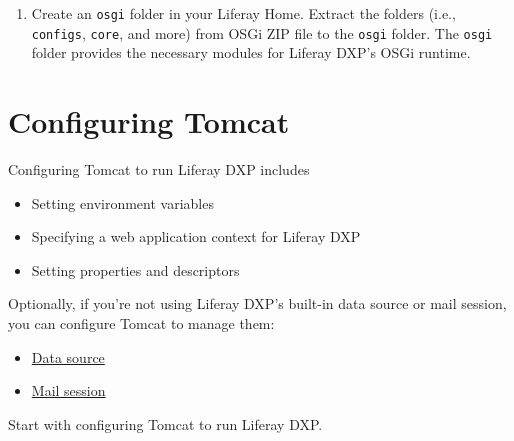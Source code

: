 \noindent\hrulefill

\begin{enumerate}
\def\labelenumi{\arabic{enumi}.}
\setcounter{enumi}{3}
\tightlist
\item
  Create an \texttt{osgi} folder in your Liferay Home. Extract the
  folders (i.e., \texttt{configs}, \texttt{core}, and more) from OSGi
  ZIP file to the \texttt{osgi} folder. The \texttt{osgi} folder
  provides the necessary modules for Liferay DXP's OSGi runtime.
\end{enumerate}

\section{Configuring Tomcat}\label{configuring-tomcat}

Configuring Tomcat to run Liferay DXP includes

\begin{itemize}
\tightlist
\item
  Setting environment variables
\item
  Specifying a web application context for Liferay DXP
\item
  Setting properties and descriptors
\end{itemize}

Optionally, if you're not using Liferay DXP's built-in data source or
mail session, you can configure Tomcat to manage them:

\begin{itemize}
\tightlist
\item
  \hyperref[database-configuration]{Data source}
\item
  \hyperref[mail-configuration]{Mail session}
\end{itemize}

Start with configuring Tomcat to run Liferay DXP.

